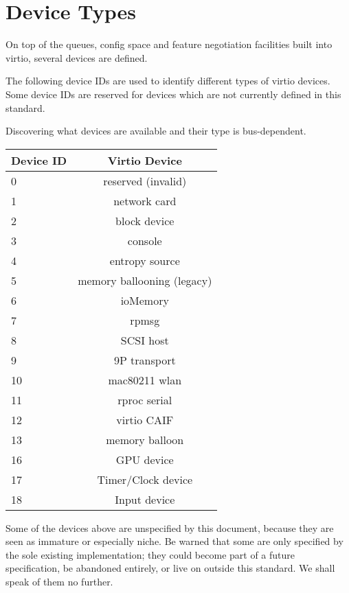 \chapter{Device Types}\label{sec:Device Types}

On top of the queues, config space and feature negotiation facilities
built into virtio, several devices are defined.

The following device IDs are used to identify different types of virtio
devices.  Some device IDs are reserved for devices which are not currently
defined in this standard.

Discovering what devices are available and their type is bus-dependent.

\begin{tabular} { |l|c| }
\hline
Device ID  &  Virtio Device    \\
\hline \hline
0          & reserved (invalid) \\
\hline
1          &   network card     \\
\hline
2          &   block device     \\
\hline
3          &      console       \\
\hline
4          &  entropy source    \\
\hline
5          & memory ballooning (legacy)  \\
\hline
6          &     ioMemory       \\
\hline
7          &       rpmsg        \\
\hline
8          &     SCSI host      \\
\hline
9          &   9P transport     \\
\hline
10         &   mac80211 wlan    \\
\hline
11         &   rproc serial     \\
\hline
12         &   virtio CAIF      \\
\hline
13         &  memory balloon    \\
\hline
16         &   GPU device       \\
\hline
17         &   Timer/Clock device \\
\hline
18         &   Input device \\
\hline
\end{tabular}

Some of the devices above are unspecified by this document,
because they are seen as immature or especially niche.  Be warned
that some are only specified by the sole existing implementation;
they could become part of a future specification, be abandoned
entirely, or live on outside this standard.  We shall speak of
them no further.

